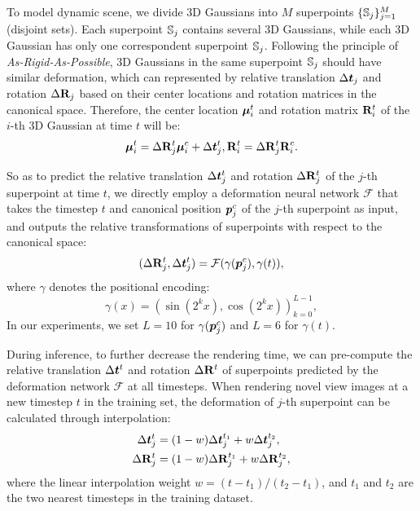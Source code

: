 To model dynamic scene, we divide 3D Gaussians into  $M$ superpoints $\{\mathbb{S}_j\}_{j=1}^{M}$ (\ie disjoint sets). Each superpoint $\mathbb{S}_j$ contains several 3D Gaussians, while each 3D Gaussian has only one correspondent superpoint $\mathbb{S}_j$. Following the principle of \textit{As-Rigid-As-Possible}, 3D Gaussians in the same superpoint $\mathbb{S}_j$ should have similar deformation, which can represented by relative translation $\Delta\bm{t}_j$ and rotation $\Delta\mathbf{R}_j$ based on their center locations and rotation matrices in the canonical space.
Therefore, the center location $\bm{\mu}_i^t$ and rotation matrix $\mathbf{R}_i^t$ of the $i$-th 3D Gaussian at time $t$ will be:
\begin{equation} \label{transformation}
    \bm{\mu}_i^t = \Delta\mathbf{R}^t_j \bm{\mu}^c_i  + \Delta\bm{t}^t_j, \mathbf{R}_i^t = \Delta\mathbf{R}^t_j \mathbf{R}_i^c.
\end{equation}

So as to predict the relative translation $\Delta\bm{t}_j^t$ and rotation $\Delta\mathbf{R}_j^t$ of the $j$-th superpoint at time $t$, we directly employ a deformation neural network $\mathcal{F}$ that takes the timestep $t$ and canonical position  $\bm{p}^c_j$ of the $j$-th superpoint as input, and outputs the relative transformations of superpoints with respect to the canonical space:
\begin{equation} \label{eq:mlp-F}
    (\Delta\mathbf{R}_j^t, \Delta\bm{t}_j^t) = \mathcal{F}(\gamma(\bm{p}^c_j), \gamma(t)),
\end{equation}
where $\gamma$ denotes the positional encoding:
\begin{equation}
    \gamma(x) = (\sin(2^k x), \cos(2^k x))_{k=0}^{L-1},
\end{equation}
In our experiments, we set $L=10$ for $\gamma(\bm{p}^c_j)$ and $L=6$ for $\gamma(t)$.


During inference, to further decrease the rendering time, we can pre-compute the relative translation $\Delta\bm{t}^t$ and rotation $\Delta\mathbf{R}^t$ of superpoints predicted by the deformation network $\mathcal{F}$ at all timesteps. When rendering novel view images at a new timestep $t$ in the training set, the deformation of $j$-th superpoint can be calculated through interpolation:
\begin{equation} \label{eq:interp}
    \begin{split}    
    \Delta\bm{t}^t_j & = (1-w)\Delta\bm{t}^{t_1}_j + w\Delta\bm{t}^{t_2}_j, \\
    \Delta\mathbf{R}^t_j & = (1-w)\Delta\mathbf{R}^{t_1}_j + w\Delta\mathbf{R}^{t_2}_j, 
    \end{split}
\end{equation}
where the linear interpolation weight $w = (t-t_1)/(t_2-t_1)$, and $t_1$ and $t_2$ are the two nearest timesteps in the training dataset.


